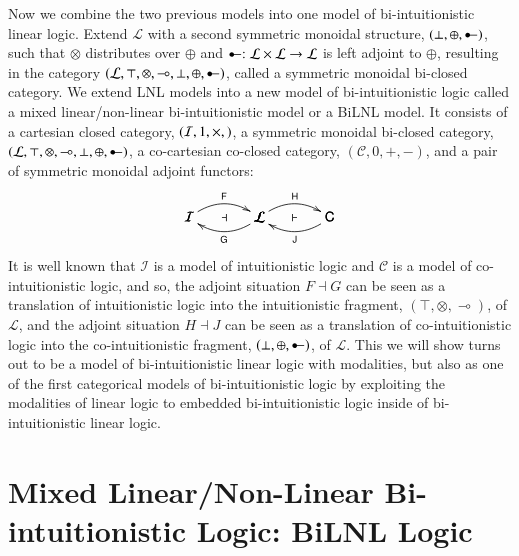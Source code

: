 \documentclass{lmcs}
\let\mto\to
\let\to\relax
\newcommand{\to}{\rightarrow}
\newcommand{\cat}[1]{\mathcal{#1}}
\newcommand{\func}[1]{\mathsf{#1}}
\newcommand{\limp}[0]{\multimap}
\newcommand{\colimp}[0]{\multimapdotinv}
\begin{document}
Now we combine the two previous models into one model of
bi-intuitionistic linear logic.  Extend $\cat{L}$ with a second
symmetric monoidal structure, $(\perp, \oplus, \colimp)$, such that
$\otimes$ distributes over $\oplus$ and $\colimp : \cat{L} \times
\cat{L} \mto \cat{L}$ is left adjoint to $\oplus$, resulting in the
category $(\cat{L}, \top, \otimes, \limp, \perp, \oplus, \colimp)$,
called a symmetric monoidal bi-closed category.  We extend LNL models
into a new model of bi-intuitionistic logic called a mixed
linear/non-linear bi-intuitionistic model or a BiLNL model.  It
consists of a cartesian closed category, $(\cat{I}, 1, \times, \to)$,
a symmetric monoidal bi-closed category, $(\cat{L}, \top,\otimes,
\limp, \perp, \oplus, \colimp)$, a co-cartesian co-closed category,
$(\cat{C}, 0,+, -)$, and a pair of symmetric monoidal adjoint
functors:
$$\bfig
\morphism(0,0)|a|/{@{>}@/^1em/}/<500,0>[\cat{I}`\cat{L};\func{F}]
\morphism(0,0)|b|/{@{<-}@/_1em/}/<500,0>[\cat{I}`\cat{L};\mathsf{G}]
\morphism(500,0)|a|/{@{>}@/^1em/}/<500,0>[\cat{L}`\func{C};\func{H}]
\morphism(500,0)|b|/{@{<-}@/_1em/}/<500,0>[\cat{L}`\func{C};\func{J}]
\place(250,0)[\dashv] \place(750,0)[\vdash] \efig$$ It is well known
that $\cat{I}$ is a model of intuitionistic logic and $\cat{C}$ is a
model of co-intuitionistic logic, and so, the adjoint situation $F
\dashv G$ can be seen as a translation of intuitionistic logic into
the intuitionistic fragment, $(\top, \otimes, \limp)$, of $\cat{L}$,
and the adjoint situation $H \dashv J$ can be seen as a translation of
co-intuitionistic logic into the co-intuitionistic fragment, $(\perp,
\oplus, \colimp)$, of $\cat{L}$.  This we will show turns out to be a
model of bi-intuitionistic linear logic with modalities, but also as
one of the first categorical models of bi-intuitionistic logic by
exploiting the modalities of linear logic to embedded
bi-intuitionistic logic inside of bi-intuitionistic linear logic.



\section{Mixed Linear/Non-Linear Bi-intuitionistic Logic: BiLNL Logic}
\label{sec:bilnl_logic}
\end{document}
